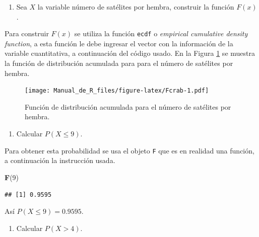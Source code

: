 \documentclass[10pt,]{krantz}
\makeatletter
\newenvironment{Shaded}{\begin{snugshade}}{\end{snugshade}}
\newcommand{\KeywordTok}[1]{\textcolor[rgb]{0.13,0.29,0.53}{\textbf{#1}}}
\newcommand{\DataTypeTok}[1]{\textcolor[rgb]{0.13,0.29,0.53}{#1}}
\newcommand{\DecValTok}[1]{\textcolor[rgb]{0.00,0.00,0.81}{#1}}
\newcommand{\StringTok}[1]{\textcolor[rgb]{0.31,0.60,0.02}{#1}}
\newcommand{\OperatorTok}[1]{\textcolor[rgb]{0.81,0.36,0.00}{\textbf{#1}}}
\newcommand{\NormalTok}[1]{#1}
\providecommand{\tightlist}{%
  \setlength{\itemsep}{0pt}\setlength{\parskip}{0pt}}
\newenvironment{kframe}{%
\medskip{}
\setlength{\fboxsep}{.8em}
 \def\at@end@of@kframe{}%
 \ifinner\ifhmode%
  \def\at@end@of@kframe{\end{minipage}}%
  \begin{minipage}{\columnwidth}%
 \fi\fi%
 \def\FrameCommand##1{\hskip\@totalleftmargin \hskip-\fboxsep
 \colorbox{shadecolor}{##1}\hskip-\fboxsep
     \hskip-\linewidth \hskip-\@totalleftmargin \hskip\columnwidth}%
 \MakeFramed {\advance\hsize-\width
   \@totalleftmargin\z@ \linewidth\hsize
   \@setminipage}}%
 {\par\unskip\endMakeFramed%
 \at@end@of@kframe}
\renewenvironment{Shaded}{\begin{kframe}}{\end{kframe}}
\makeatother
\begin{document}
\begin{enumerate}
\def\labelenumi{\arabic{enumi})}
\setcounter{enumi}{1}
\tightlist
\item
  Sea \(X\) la variable número de satélites por hembra, construir la
  función \(F(x)\).
\end{enumerate}

Para construir \(F(x)\) se utiliza la función \texttt{ecdf} o
\emph{empirical cumulative density function}, a esta función le debe
ingresar el vector con la información de la variable cuantitativa, a
continuación del código usado. En la Figura \ref{fig:Fcrab} se muestra
la función de distribución acumulada para para el número de satélites
por hembra.

\begin{Shaded}
\end{Shaded}

\begin{figure}
\centering
\texttt{[image: Manual\_de\_R\_files/figure-latex/Fcrab-1.pdf]}
\caption{\label{fig:Fcrab}Función de distribución acumulada para el número
de satélites por hembra.}
\end{figure}

\begin{enumerate}
\def\labelenumi{\arabic{enumi})}
\setcounter{enumi}{2}
\tightlist
\item
  Calcular \(P(X \leq 9)\).
\end{enumerate}

Para obtener esta probabilidad se usa el objeto \texttt{F} que es en
realidad una función, a continuación la instrucción usada.

\begin{Shaded}
\begin{Highlighting}[]
\KeywordTok{F}\NormalTok{(}\DecValTok{9}\NormalTok{)}
\end{Highlighting}
\end{Shaded}

\begin{verbatim}
## [1] 0.9595
\end{verbatim}

Así \(P(X \leq 9)=0.9595\).

\begin{enumerate}
\def\labelenumi{\arabic{enumi})}
\setcounter{enumi}{3}
\tightlist
\item
  Calcular \(P(X > 4)\).
\end{enumerate}
\end{document}
